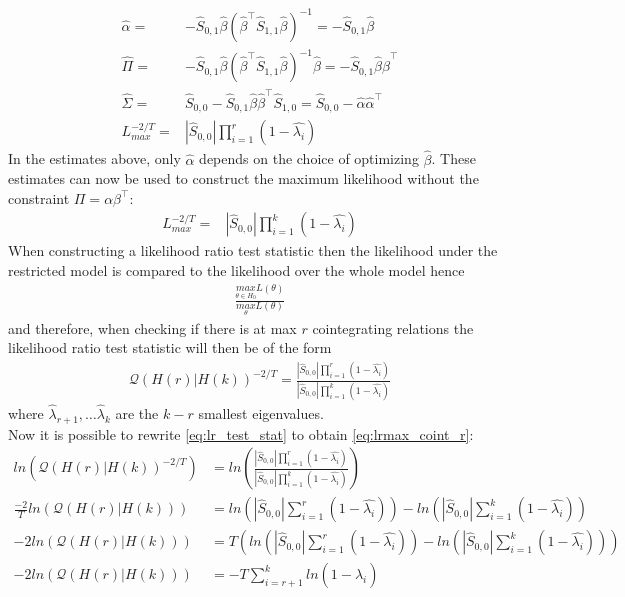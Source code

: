 \begin{bevis}
\begin{align*}
    \hat{\alpha}=&-\hat{S}_{0,1}\hat{\beta}(\hat{\beta}^\top \hat{S}_{1,1}\hat{\beta})^{-1}=-\hat{S}_{0,1}\hat{\beta}\\
    \hat{\Pi}=&-\hat{S}_{0,1}\hat{\beta}(\hat{\beta}^\top \hat{S}_{1,1}\hat{\beta})^{-1}\hat{\beta}=-\hat{S}_{0,1}\hat{\beta}\hat{\beta}^\top\\
    \hat{\Sigma}=&\hat{S}_{0,0}-\hat{S}_{0,1}\hat{\beta}\hat{\beta}^\top\hat{S}_{1,0}=\hat{S}_{0,0}-\hat{\alpha}\hat{\alpha}^\top\\
    L_{max}^{-2/T}=&|\hat{S}_{0,0}|\prod_{i=1}^r(1-\hat{\lambda_i})
\end{align*}
In the estimates above, only $\hat{\alpha}$ depends on the choice of optimizing $\hat{\beta}$. These estimates can now be used to construct the maximum likelihood without the constraint $\Pi=\alpha\beta^{\top}$:
\begin{align*}
    L_{max}^{-2/T}=&|\hat{S}_{0,0}|\prod_{i=1}^k(1-\hat{\lambda_i})
\end{align*}
When constructing a likelihood ratio test statistic then the likelihood under the restricted model is compared to the likelihood over the whole model hence
\begin{align*}
    \frac{\underset{\theta\in H_0}{max}L(\theta)}{\underset{\theta}{max}L(\theta)}
\end{align*}
and therefore, when checking if there is at max $r$ cointegrating relations the likelihood ratio test statistic will then be of the form
\begin{align}\label{eq:lr_test_stat}
\mathcal{Q}(H(r)|H(k))^{-2/T}=\frac{|\hat{S}_{0,0}|\prod_{i=1}^r (1-\hat{\lambda_i})}{|\hat{S}_{0,0}|\prod_{i=1}^k(1-\hat{\lambda_i})}
\end{align}
where $\hat{\lambda}_{r+1},\ldots\hat{\lambda}_k$ are the $k-r$ smallest eigenvalues.\\
Now it is possible to rewrite \eqref{eq:lr_test_stat} to obtain \eqref{eq:lrmax_coint_r}:
\begin{align*}
ln\left(\mathcal{Q}(H(r)|H(k))^{-2/T}\right)&=ln\left(\frac{|\hat{S}_{0,0}|\prod_{i=1}^r (1-\hat{\lambda_i})}{|\hat{S}_{0,0}|\prod_{i=1}^k(1-\hat{\lambda_i})}\right)\\
    \frac{-2}{T}ln\left(\mathcal{Q}(H(r)|H(k))\right)&=ln\left(|\hat{S}_{0,0}| \sum_{i=1}^r (1-\hat{\lambda_i})\right)-ln\left(|\hat{S}_{0,0}|\sum_{i=1}^k (1-\hat{\lambda_i})\right)\\
    -2ln\left(\mathcal{Q}(H(r)|H(k))\right)&=T\left( ln\left(|\hat{S}_{0,0}| \sum_{i=1}^r (1-\hat{\lambda_i})\right)-ln\left(|\hat{S}_{0,0}|\sum_{i=1}^k (1-\hat{\lambda_i})\right)\right)\\
    -2ln\left(\mathcal{Q}(H(r)|H(k))\right)&=-T\sum_{i=r+1}^kln(1-\hat{\lambda}_i)
\end{align*}
\end{bevis} 




